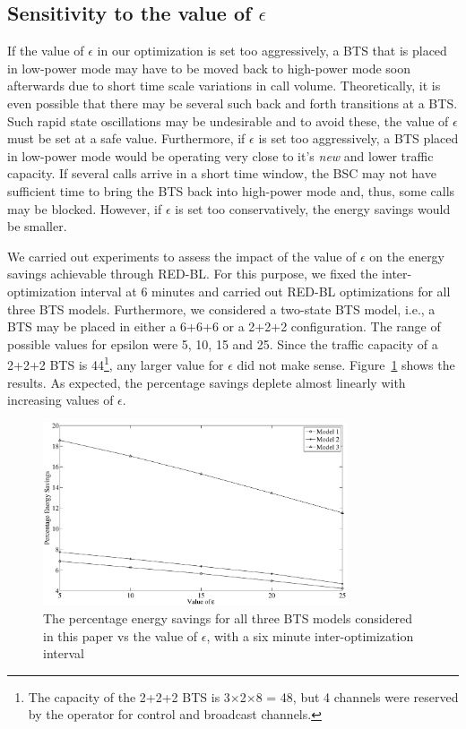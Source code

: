 \subsection{Sensitivity to the value of $\epsilon$}
\label{subsec:results3}
If the value of $\epsilon$ in our optimization is set too aggressively, a BTS that is placed in low-power mode may have to be moved back to high-power mode soon afterwards due to short time scale variations in call volume. Theoretically, it is even possible that there may be several such back and forth transitions at a BTS. Such rapid state oscillations may be undesirable and to avoid these, the value of $\epsilon$ must be set at a safe value. Furthermore, if $\epsilon$ is set too aggressively, a BTS placed in low-power mode would be operating very close to it's \textit{new} and lower traffic capacity. If several calls arrive in a short time window, the BSC may not have sufficient time to bring the BTS back into high-power mode and, thus, some calls may be blocked. However, if $\epsilon$ is set too conservatively, the energy savings would be smaller. 

We carried out experiments to assess the impact of the value of $\epsilon$ on the energy savings achievable through RED-BL. For this purpose, we fixed the inter-optimization interval at 6 minutes and carried out RED-BL optimizations for all three BTS models. Furthermore, we considered a two-state BTS model, i.e., a BTS may be placed in either a 6+6+6 or a 2+2+2 configuration. The range of possible values for epsilon were 5, 10, 15 and 25. Since the traffic capacity of a 2+2+2 BTS is 44\footnote{The capacity of the 2+2+2 BTS is 3$\times$2$\times$8 = 48, but 4 channels were reserved by the operator for control and broadcast channels.}, any larger value for $\epsilon$ did not make sense. Figure~\ref{fig:case2:results6} shows the results. As expected, the percentage savings deplete almost linearly with increasing values of $\epsilon$.

\begin{figure}
\centering
\includegraphics[width=0.8\textwidth]{figures/epsilonresults.eps}
\caption{The percentage energy savings for all three BTS models considered in this paper vs the value of $\epsilon$, with a six minute inter-optimization interval}
\label{fig:case2:results6}
\end{figure}

